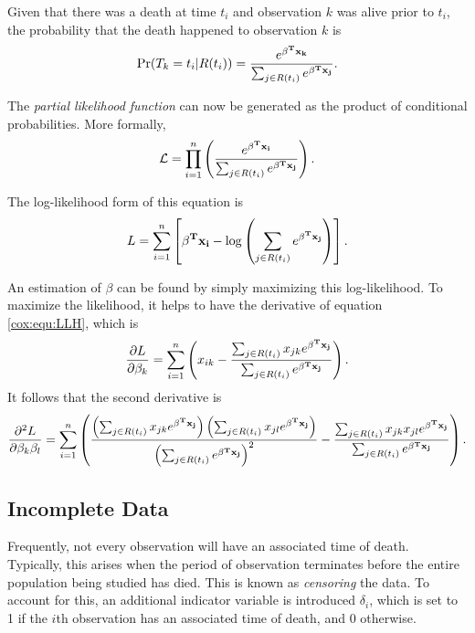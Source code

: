 Given that there was a death at time $t_i$ and observation $k$ was alive prior
to $t_i$, the probability that the death happened to observation $k$  is
\begin{equation}\label{cox:equ:death-prob}
\Pr(T_k = t_i | R(t_i)) =  \frac{e^{\bold{\beta^T x_k} }}{ \sum_{j \in R(t_i)} e^{\bold{\beta^T x_j}}}.
\end{equation}

The \textit{partial likelihood function} can now be generated as the product of conditional probabilities.
More formally,
\begin{equation}\label{cox:equ:likelihood}
\mathcal{L} = \prod_{i = 1}^n \left(  \frac{e^{\bold{\beta^T x_i} }}{ \sum_{j \in R(t_i)} e^{\bold{\beta^T x_j}}} \right).
\end{equation}

 The log-likelihood form of this equation is
\begin{equation}\label{cox:equ:LLH}
L = \sum_{i = 1}^n \left[  \bold{\beta^T x_i} - \log\left(\sum_{j \in R(t_i)} e^{\bold{\beta^T x_j} } \right) \right].
\end{equation}

An estimation of $\beta$ can be found by simply maximizing this log-likelihood.
To maximize the likelihood, it helps to have the derivative of equation
\ref{cox:equ:LLH}, which is
\begin{equation}\label{cox:equ:LLH derivative}
\frac{\partial L}{\partial \beta_k} = \sum_{i = 1}^n \left( x_{ik} - \frac{\sum_{j \in R(t_i)} x_{jk} e^{\bold{\beta^T x_j} } }{\sum_{j \in R(t_i)} e^{\bold{\beta^T x_j} } } \right).
\end{equation}
It follows that the second derivative is
\begin{equation}\label{cox:equ:LLH second derivative}
\frac{\partial^2 L}{\partial \beta_k \beta_l} = \sum_{i = 1}^n
            \left(
                \frac{\left(  \sum_{j \in R(t_i)} x_{jk} e^{\bold{\beta^T x_j} } \right)
                            \left(  \sum_{j \in R(t_i)} x_{jl} e^{\bold{\beta^T x_j} } \right)}
                     {\left( \sum_{j \in R(t_i)} e^{\bold{\beta^T x_j} } \right)^2 } -
                \frac{  \sum_{j \in R(t_i)} x_{jk}x_{jl} e^{\bold{\beta^T x_j} } }
                     {\sum_{j \in R(t_i)} e^{\bold{\beta^T x_j} } }
            \right).
\end{equation}

\subsection{Incomplete Data}
Frequently, not every observation will have an associated time of death.
Typically, this arises when the period of observation terminates before the
entire population being studied has died.  This is known as \textit{censoring}
the data.  To account for this, an additional indicator variable is introduced
$\delta_i$, which is set to 1 if the $i$th observation has an associated time of
death, and 0 otherwise.

